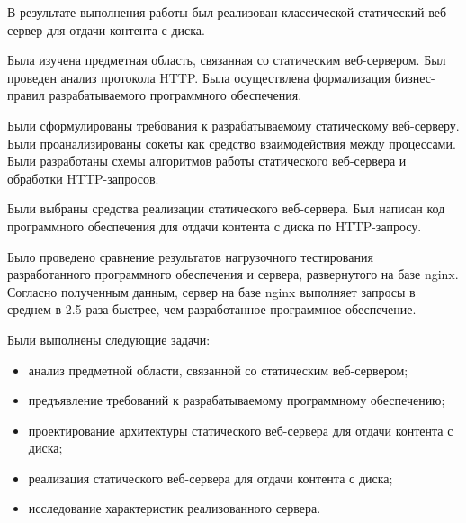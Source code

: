
В результате выполнения работы был реализован классической статический веб-сервер для отдачи контента с диска.

Была изучена предметная область, связанная со статическим веб-сервером.
Был проведен анализ протокола HTTP.
Была осуществлена формализация бизнес-правил разрабатываемого программного обеспечения.

Были сформулированы требования к разрабатываемому статическому веб-серверу.
Были проанализированы сокеты как средство взаимодействия между процессами.
Были разработаны схемы алгоритмов работы статического веб-сервера и обработки HTTP-запросов.

Были выбраны средства реализации статического веб-сервера.
Был написан код программного обеспечения для отдачи контента с диска по HTTP-запросу.

Было проведено сравнение результатов нагрузочного тестирования разработанного программного обеспечения и сервера, развернутого на базе nginx. Согласно полученным данным, сервер на базе nginx выполняет запросы в среднем в 2.5 раза быстрее, чем разработанное программное обеспечение.

Были выполнены следующие задачи:
\begin{itemize}
	\item анализ предметной области, связанной со статическим веб-сервером;
	\item предъявление требований к разрабатываемому программному обеспечению;
	\item проектирование архитектуры статического веб-сервера для отдачи контента с диска;
	\item реализация статического веб-сервера для отдачи контента с диска;
	\item исследование характеристик реализованного сервера.
\end{itemize}
